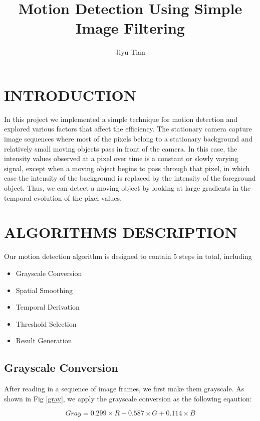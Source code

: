 \documentclass[letterpaper, 10 pt, conference]{ieeeconf}
\title{\Huge Motion Detection Using Simple Image Filtering}
\author{Jiyu Tian}
\begin{document}
\maketitle
\thispagestyle{empty}
\pagestyle{empty}


\section{INTRODUCTION}
In this project we implemented a simple technique for motion detection and explored various factors that affect the efficiency. The stationary camera capture image sequences where most of the pixels belong to a stationary background and relatively small moving objects pass in front of the camera. In this case, the intensity values observed at a pixel over time is a constant or slowly varying signal, except when a moving object begins to pass through that pixel, in which case the intensity of the background is replaced by the intensity of the foreground object. Thus, we can detect a moving object by looking at large gradients in the temporal evolution of the pixel values.

\section{ALGORITHMS DESCRIPTION}
Our motion detection algorithm is designed to contain 5 steps in total, including 
\begin{itemize}
    \item Grayscale Conversion
    \item Spatial Smoothing
    \item Temporal Derivation
    \item Threshold Selection
    \item Result Generation
\end{itemize}
\subsection{Grayscale Conversion}
After reading in a sequence of image frames, we first make them grayscale. As shown in Fig \ref{gray}, we apply the grayscale conversion as the following eqaution:

\begin{equation}
Gray = 0.299 \times R + 0.587 \times G + 0.114 \times B
\end{equation}
\end{document}
